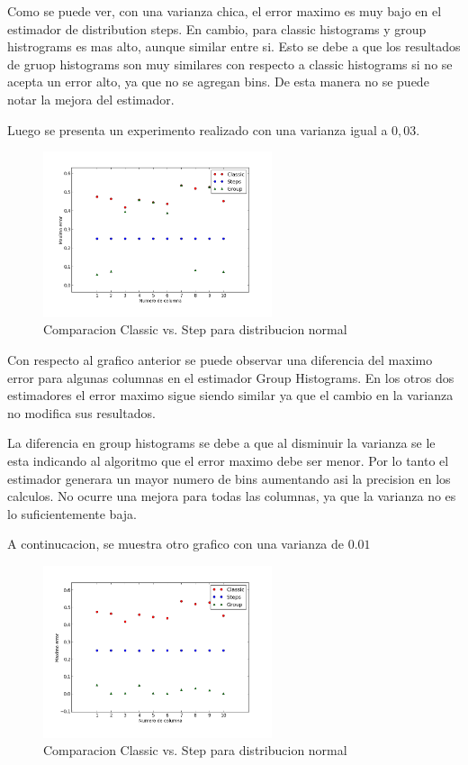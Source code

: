 \documentclass[10pt, a4paper,english,spanish,hidelinks]{article}
\begin{document}
Como se puede ver, con una varianza chica, el error maximo es muy bajo en el estimador de distribution steps. En cambio, para classic histograms y group histrograms es mas alto, aunque similar entre si. Esto se debe a que los resultados de gruop histograms son muy similares con respecto a classic histograms si no se acepta un error alto, ya que no se agregan bins. De esta manera no se puede notar la mejora del estimador.


Luego se presenta un experimento realizado con una varianza igual a $0,03$. 

\begin{figure}
  \centering
  \includegraphics[width=0.6\textwidth]{./imagenes/ejb2_normal_t_003.png}
  \caption{Comparacion Classic vs. Step para distribucion normal}
\end{figure}

Con respecto al grafico anterior se puede observar una diferencia del maximo error para algunas columnas en el estimador Group Histograms. En los otros dos estimadores el error maximo sigue siendo similar ya que el cambio en la varianza no modifica sus resultados. 

La diferencia en group histograms se debe a que al disminuir la varianza se le esta indicando al algoritmo que el error maximo debe ser menor. Por lo tanto el estimador generara un mayor numero de bins aumentando asi la precision en los calculos. No ocurre una mejora para todas las columnas, ya que la varianza no es lo suficientemente baja. 


A continucacion, se muestra otro grafico con una varianza de $0.01$

\begin{figure}
  \centering
  \includegraphics[width=0.6\textwidth]{./imagenes/ejb2_normal_t_001.png}
  \caption{Comparacion Classic vs. Step para distribucion normal}
\end{figure}
\end{document}
